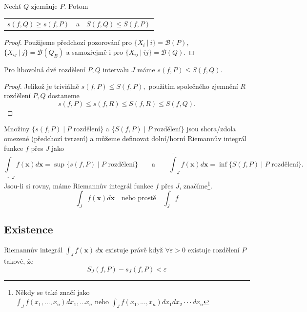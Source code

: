 \documentclass[../main.tex]{subfiles}
\begin{document}
\begin{lemma}
	Nechť $Q$ zjemňuje $P$. Potom
	\begin{center}
	    \begin{tabular}{c c c}
	        $s(f,Q) \geq s(f,P)$ & a & $S(f,Q) \leq S(f,P)$
	    \end{tabular}
	\end{center}
\end{lemma}

\begin{proof}
	Použijeme předchozí pozorování pro $\{X_i\ |\ i\} = \mathcal{B}(P)$, $\{X_{ij}\ |\ j\} = \mathcal{B}(Q_B)$ a samozřejmě
	i pro $\{X_{ij}\ |\ ij\} = \mathcal{B}(Q).$
\end{proof}

\begin{lemma}
	Pro libovolná dvě rozdělení $P,Q$ intervalu $J$ máme $s(f,P) \leq S(f,Q)$.
\end{lemma}

\begin{proof}
	Jelikož je triviálně $s(f,P) \leq S(f,P),$ použitím společného zjemnění $R$ rozdělení $P,Q$ dostaneme
	\[s(f,P) \leq s(f,R) \leq S(f,R) \leq S(f,Q).\]
\end{proof}

\begin{definition}
	Množiny $\{s(f,P) \mid P \text{ rozdělení}\}$ a $\{S(f,P) \mid P \text{ rozdělení}\}$ jsou shora/zdola omezené (předchozí tvrzení) a můžeme definovat dolní/horní Riemannův integrál funkce $f$ přes $J$ jako
	\[\underline{\int}_J f(\textbf{x})d\textbf{x} = \sup\{s(f,P) \mid P \text{ rozdělení}\} \qquad \text{a} \qquad
	\overline{\int}_J f(\textbf{x})d\textbf{x} = \inf\{S(f,P) \mid P \text{ rozdělení}\}.\]
	Jsou-li si rovny, máme Riemannův integrál funkce $f$ přes $J$, značíme\footnote{Někdy se také značí jako \(\int_J f(x_1,...,x_n)dx_1,...x_n \text{ nebo } \int_J f(x_1,...,x_n)dx_1 dx_2\cdot \cdot \cdot dx_n\)}.
	$$\int_J f(\textbf{x})d\textbf{x} \quad \text{nebo prostě} \quad \int_J f $$
\end{definition}

\subsection{Existence}
\begin{theorem}
	Riemannův integrál $\int_{J} f(\mathbf{x}) \,d\mathbf{x}$ existuje právě když
	$\forall \varepsilon > 0$ existuje rozdělení $P$ takové, že
	\[ S_J(f,P) - s_J(f,P) < \varepsilon \]
\end{theorem}
\end{document}
